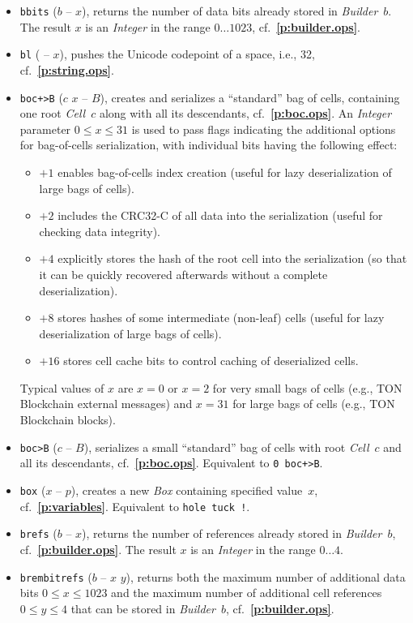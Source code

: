 \documentclass[12pt,oneside]{article}
\def\refpoint#1{{\rm\textbf{\ref{#1}}}}
\let\ptref=\refpoint
\begin{document}
\begin{itemize}
\item {\tt bbits} ($b$ -- $x$), returns the number of data bits already stored in {\em Builder\/}~$b$. The result $x$ is an {\em Integer\/} in the range $0\dots1023$, cf.~\ptref{p:builder.ops}.
\item {\tt bl} ( -- $x$), pushes the Unicode codepoint of a space, i.e., 32, cf.~\ptref{p:string.ops}.
\item {\tt boc+>B} ($c$ $x$ -- $B$), creates and serializes a ``standard'' bag of cells, containing one root {\em Cell\/}~$c$ along with all its descendants, cf.~\ptref{p:boc.ops}. An {\em Integer\/} parameter $0\leq x\leq 31$ is used to pass flags indicating the additional options for bag-of-cells serialization, with individual bits having the following effect:
  \begin{itemize}
  \item $+1$ enables bag-of-cells index creation (useful for lazy deserialization of large bags of cells).
  \item $+2$ includes the CRC32-C of all data into the serialization (useful for checking data integrity).
  \item $+4$ explicitly stores the hash of the root cell into the serialization (so that it can be quickly recovered afterwards without a complete deserialization).
  \item $+8$ stores hashes of some intermediate (non-leaf) cells (useful for lazy deserialization of large bags of cells).
  \item $+16$ stores cell cache bits to control caching of deserialized cells.
  \end{itemize}
Typical values of $x$ are $x=0$ or $x=2$ for very small bags of cells (e.g., TON Blockchain external messages) and $x=31$ for large bags of cells (e.g., TON Blockchain blocks).
\item {\tt boc>B} ($c$ -- $B$), serializes a small ``standard'' bag of cells with root {\em Cell\/}~$c$ and all its descendants, cf.~\ptref{p:boc.ops}. Equivalent to {\tt 0 boc+>B}.
\item {\tt box} ($x$ -- $p$), creates a new {\em Box\/} containing specified value~$x$, cf.~\ptref{p:variables}. Equivalent to {\tt hole tuck !}.
\item {\tt brefs} ($b$ -- $x$), returns the number of references already stored in {\em Builder\/}~$b$, cf.~\ptref{p:builder.ops}. The result $x$ is an {\em Integer\/} in the range $0\dots4$.
\item {\tt brembitrefs} ($b$ -- $x$ $y$), returns both the maximum number of additional data bits $0\leq x\leq 1023$ and the maximum number of additional cell references $0\leq y\leq 4$ that can be stored in {\em Builder\/}~$b$, cf.~\ptref{p:builder.ops}.

\end{itemize}
\end{document}
